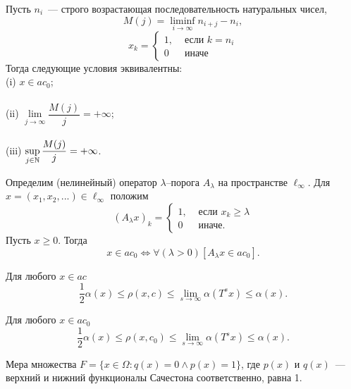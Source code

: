 	Пусть $n_i$~--- строго возрастающая последовательность натуральных чисел,
	\begin{equation}
		\label{eq:definition_M_j}
		M(j) = \liminf_{i\to\infty} n_{i+j} - n_i,
	\end{equation}
	\begin{equation}
		x_k = \left\{\begin{array}{ll}
			1, & \mbox{~если~} k = n_i
			\\
			0  & \mbox{~иначе~}
		\end{array}\right.
	\end{equation}
	Тогда следующие условия эквивалентны:
	\\
	(i)   $x \in ac_0$;
	\\\\
	(ii)  $\lim\limits_{j \to \infty} \dfrac{M(j)}{j} = +\infty$;
	\\\\
	(iii) $\sup\limits_{j \in \mathbb{N}}     \dfrac{M(j)}{j} = +\infty$.


	Определим (нелинейный) оператор $\lambda$--порога $A_\lambda$ на пространстве $\ell_\infty$.
	Для $x = (x_1, x_2, ...) \in \ell_\infty$ положим
	\begin{equation}
		(A_\lambda x)_k = \begin{cases}
			1, & \mbox{~если~} x_k \geq \lambda
			\\
			0  & \mbox{~иначе.~}
		\end{cases}
	\end{equation}
	Пусть $x\geq 0$.
	Тогда
	\begin{equation}
		x\in ac_0 \Leftrightarrow
		\forall(\lambda>0)[A_\lambda x \in ac_0]
		.
	\end{equation}

	Для любого $x\in ac$
	\begin{equation}
		\frac{1}{2} \alpha(x) \leq \rho(x,c)\leq \lim_{s\to\infty} \alpha(T^s x)
		\leq \alpha(x)
		.
	\end{equation}

	Для любого $x\in ac_0$
	\begin{equation}
		\frac{1}{2} \alpha(x) \leq \rho(x,c_0)\leq \lim_{s\to\infty} \alpha(T^s x)
		\leq \alpha(x)
		.
	\end{equation}

	Мера множества $F=\{x\in\Omega : q(x) = 0 \wedge p(x)= 1\}$,
	где $p(x)$ и $q(x)$~--- верхний и нижний функционалы Сачестона соответственно,
	равна 1.


